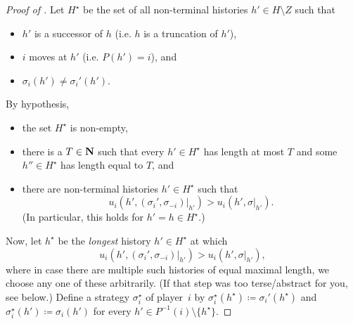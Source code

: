\begin{proof}[Proof of ]
	Let $H^\star$ be the set of all non-terminal histories $h' \in H \setminus Z$ such that

	\begin{itemize}
	
		\item $h'$ is a successor of $h$ (i.e. $h$ is a truncation of $h'$),

		\item $i$ moves at $h'$ (i.e. $P(h') = i$), and

		\item $\sigma_i(h') \neq \sigma_i'(h')$.
	
	\end{itemize}
	By hypothesis,
	
	\begin{itemize}
	
		\item the set $H^\star$ is non-empty,

		\item there is a $T \in \mathbf{N}$ such that every $h' \in H^\star$ has length at most $T$ and some $h'' \in H^\star$ has length equal to $T$, and

		\item there are non-terminal histories $h' \in H^\star$ such that
		\begin{equation*}
			u_i\left( h', (\sigma_i',\sigma_{-i})|_{h'} \right)
			> u_i\left( h', \sigma|_{h'} \right) .
		\end{equation*}
		(In particular, this holds for $h' = h \in H^\star$.)
	
	\end{itemize}
	Now, let $h^\star$ be the \emph{longest} history $h' \in H^\star$ at which 
	\begin{equation*}
		u_i( h', (\sigma_i',\sigma_{-i})|_{h'} )
		> u_i( h', \sigma|_{h'} ) ,
	\end{equation*}
	where in case there are multiple such histories of equal maximal length, we choose any one of these arbitrarily. (If that step was too terse/abstract for you, see  below.)
	Define a strategy $\sigma_i^\star$ of player~$i$ by $\sigma_i^\star(h^\star) \coloneqq \sigma_i'(h^\star)$ and $\sigma_i^\star(h') \coloneqq \sigma_i(h')$ for every $h' \in P^{-1}(i) \setminus \{h^\star\}$.
\end{proof}

